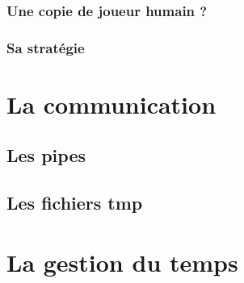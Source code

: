 \documentclass{article}
\begin{document}
\subsubsection{Une copie de joueur humain ?}
\subsubsection{Sa stratégie}

\section{La communication}

\subsection{Les pipes}
\subsection{Les fichiers tmp}

\section{La gestion du temps}
\end{document}

